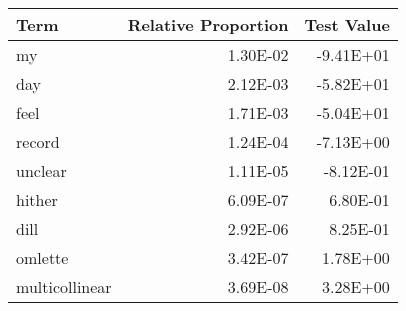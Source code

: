 \begin{table}[ht]
\centering
\begin{tabular}{lrr}
  \hline
Term & Relative Proportion & Test Value \\ 
  \hline
my & 1.30E-02 & -9.41E+01 \\ 
  day & 2.12E-03 & -5.82E+01 \\ 
  feel & 1.71E-03 & -5.04E+01 \\ 
  record & 1.24E-04 & -7.13E+00 \\ 
  unclear & 1.11E-05 & -8.12E-01 \\ 
  hither & 6.09E-07 & 6.80E-01 \\ 
  dill & 2.92E-06 & 8.25E-01 \\ 
  omlette & 3.42E-07 & 1.78E+00 \\ 
  multicollinear & 3.69E-08 & 3.28E+00 \\ 
   \hline
\end{tabular}
\end{table}
